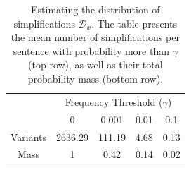 \documentclass[11pt, a4paper]{article}
\newcommand{\lc}[1]{\footnote{\color{blue}LC: #1}}
\begin{document}



\begin{table}[t]
	\centering
	\small
	\singlespacing
	\begin{tabular}{c|c|c|c|c|}
		& \multicolumn{4}{c|}{Frequency Threshold ($\gamma$)}\\ 
		& \multicolumn{1}{c}{0} & \multicolumn{1}{c}{0.001} & \multicolumn{1}{c}{0.01} & \multicolumn{1}{c|}{0.1}
		\\
		\hline
		Variants & 2636.29 & 111.19 & 4.68 & 0.13
		\\
		Mass & 1 & 0.42 & 0.14 & 0.02\\
		\hline
	\end{tabular}
	\caption{\label{tab:simplifications_dist}
		Estimating the distribution of simplifications $\mathcal{D}_x$.
		The table presents the mean number of simplifications per sentence with probability more than
		$\gamma$ (top row), as well as their total probability mass (bottom row).
	}
\end{table}
\end{document}
